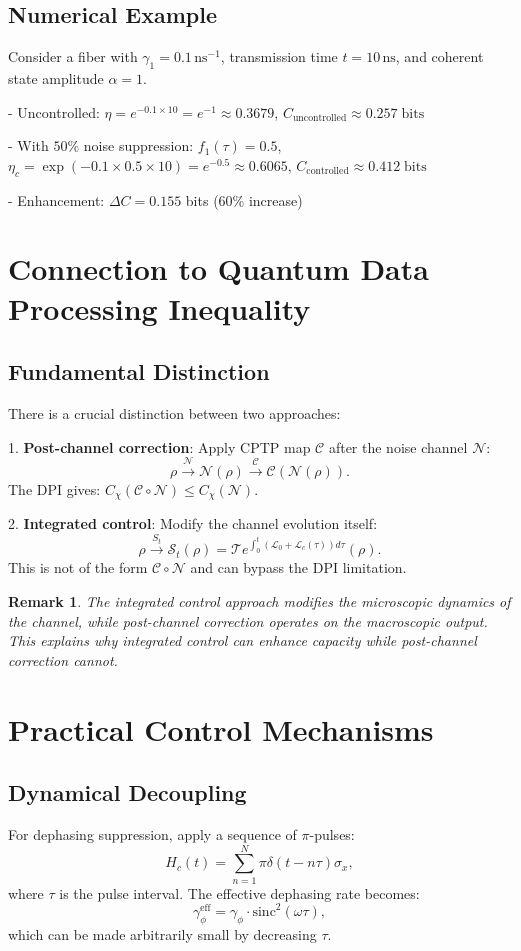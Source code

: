 \documentclass[12pt]{article}
\newtheorem{remark}[theorem]{Remark}
\newcommand{\N}{\mathcal{N}}
\newcommand{\SJ}{\mathcal{S}}
\newcommand{\Lgen}{\mathcal{L}}
\newcommand{\T}{\mathcal{T}}
\begin{document}
\subsection{Numerical Example}
Consider a fiber with $\gamma_{1} = 0.1 \,\mathrm{ns}^{-1}$, transmission time $t = 10 \,\mathrm{ns}$, and coherent state amplitude $\alpha = 1$.

- Uncontrolled: $\eta = e^{-0.1 \times 10} = e^{-1} \approx 0.3679$, $C_{\mathrm{uncontrolled}}\approx 0.257\;\mathrm{bits}$

- With $50\%$ noise suppression: $f_{1}(\tau) = 0.5$, $\eta_{c} = \exp (-0.1\times 0.5\times 10) = e^{-0.5}\approx 0.6065$, $C_{\mathrm{controlled}}\approx 0.412\;\mathrm{bits}$

- Enhancement: $\Delta C = 0.155$ bits (60\% increase)

\section{Connection to Quantum Data Processing Inequality}
\subsection{Fundamental Distinction}
There is a crucial distinction between two approaches:

1. \textbf{Post-channel correction}: Apply CPTP map $\mathcal{C}$ after the noise channel $\N$:
\[
\rho \xrightarrow{\N}\N(\rho)\xrightarrow{\mathcal{C}}\mathcal{C}(\N(\rho)).
\]
The DPI gives: $C_{\chi}(\mathcal{C}\circ \N)\leq C_{\chi}(\N)$.

2. \textbf{Integrated control}: Modify the channel evolution itself:
\[
\rho \xrightarrow{S_{t}}\SJ_{t}(\rho) = \T e^{\int_{0}^{t}(\Lgen_{0} + \Lgen_{c}(\tau))d\tau}(\rho).
\]
This is not of the form $\mathcal{C}\circ \N$ and can bypass the DPI limitation.

\begin{remark}
The integrated control approach modifies the microscopic dynamics of the channel, while post-channel correction operates on the macroscopic output. This explains why integrated control can enhance capacity while post-channel correction cannot.
\end{remark}

\section{Practical Control Mechanisms}
\subsection{Dynamical Decoupling}
For dephasing suppression, apply a sequence of $\pi$-pulses:
\[
H_{c}(t) = \sum_{n = 1}^{N}\pi \delta (t - n\tau)\sigma_{x},
\]
where $\tau$ is the pulse interval. The effective dephasing rate becomes:
\[
\gamma_{\phi}^{\mathrm{eff}} = \gamma_{\phi}\cdot \mathrm{sinc}^{2}(\omega \tau),
\]
which can be made arbitrarily small by decreasing $\tau$.
\end{document}

